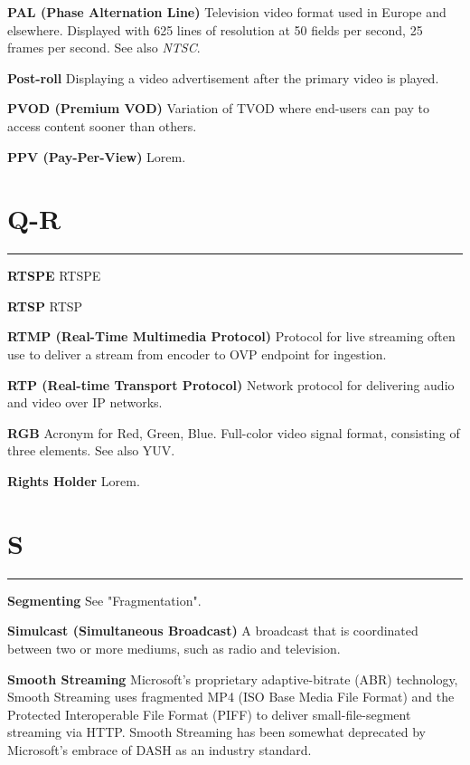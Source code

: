 \smallskip
\textbf{PAL (Phase Alternation Line)}
Television video format used in Europe and elsewhere. Displayed with 625 lines of resolution at 50 fields per second, 25 frames per second. See also \textit{NTSC}.

\smallskip
\textbf{Post-roll}
Displaying a video advertisement after the primary video is played.

\smallskip
\textbf{PVOD (Premium VOD)}
Variation of TVOD where end-users can pay to access content sooner than others.

\smallskip
\textbf{PPV (Pay-Per-View)}
Lorem.


\section{Q-R}
\hrule

\medskip
\textbf{RTSPE}
RTSPE

\smallskip
\textbf{RTSP}
RTSP

\smallskip
\textbf{RTMP (Real-Time Multimedia Protocol)}
Protocol for live streaming often use to deliver a stream from encoder to OVP endpoint for ingestion.

\smallskip
\textbf{RTP (Real-time Transport Protocol)}
Network protocol for delivering audio and video over IP networks.

\smallskip
\textbf{RGB}
Acronym for Red, Green, Blue. Full-color video signal format, consisting of three elements. See also YUV.

\smallskip
\textbf{Rights Holder}
Lorem.

\section{S}
\hrule

\medskip
\textbf{Segmenting}
See "Fragmentation".

\smallskip
\textbf{Simulcast (Simultaneous Broadcast)}
A broadcast that is coordinated between two or more mediums, such as radio and television.

\smallskip
\textbf{Smooth Streaming}
Microsoft’s proprietary adaptive-bitrate (ABR) technology, Smooth Streaming uses fragmented MP4 (ISO Base Media File Format) and the Protected Interoperable File Format (PIFF) to deliver small-file-segment streaming via HTTP. Smooth Streaming has been somewhat deprecated by Microsoft’s embrace of DASH as an industry standard.

